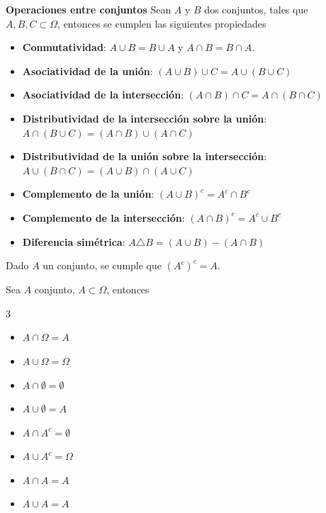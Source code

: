 \begin{Teo}\textbf{Operaciones entre conjuntos} Sean $A$ y $B$ dos conjuntos, tales que $A,B,C\subset\Omega$, entonces se cumplen las siguientes propiedades
\begin{itemize}
\item \textbf{Conmutatividad}: $A\cup B = B\cup A$ y $A\cap B = B\cap A$.
\item \textbf{Asociatividad de la uni\'on}: $\left(A\cup B\right)\cup C = A\cup\left(B\cup C\right)$
\item \textbf{Asociatividad de la intersecci\'on}: $\left(A\cap B\right)\cap C = A\cap\left(B\cap C\right)$
\item \textbf{Distributividad de la intersecci\'on sobre la uni\'on}: $A\cap\left(B\cup C\right)=\left(A\cap B\right)\cup\left(A\cap C\right)$
\item \textbf{Distributividad de la uni\'on sobre la intersecci\'on}: $A\cup\left(B\cap C\right)=\left(A\cup B\right)\cap\left(A\cup C\right)$
\item \textbf{Complemento de la uni\'on}: $\left(A\cup B\right)^{c}=A^{c}\cap B^{c}$
\item \textbf{Complemento de la intersecci\'on}: $\left(A\cap B\right)^{c}=A^{c}\cup B^{c}$
\item \textbf{Diferencia sim\'etrica}: $A\triangle B=\left(A\cup B\right)-\left(A\cap B\right)$
\end{itemize}
\end{Teo}

\begin{Teo}
Dado $A$ un conjunto, se cumple que $\left(A^{c}\right)^{c}=A$.
\end{Teo}


\begin{Teo}
Sea $A$ conjunto, $A\subset\Omega$, entonces
\begin{multicols}{3}
\begin{itemize}
\item[i) ] $A\cap\Omega=A$

\item[ii) ] $A\cup\Omega=\Omega$
\item[iii) ] $A\cap\emptyset=\emptyset$ 
\item[iv) ] $A\cup\emptyset=A$ 
\item[v) ] $A\cap A^{c}=\emptyset$

\item[vi) ] $A\cup A^{c}=\Omega$
\item[vii) ] $A\cap A=A$ 
\item[viii) ] $A\cup A=A$ 

\end{itemize}
\end{multicols}
\end{Teo}


